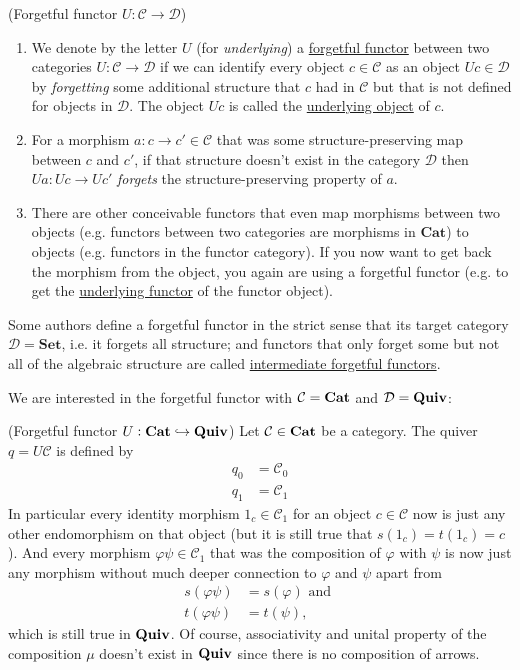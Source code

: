 \begin{example}{(Forgetful functor $U : \mathcal{C} \rightarrow \mathcal{D}$)}
\begin{enumerate}
\renewcommand{\labelenumi}{(\theenumi)}
\item We denote by the letter $U$ (for \textit{underlying}) a \ul{forgetful functor} between two categories $U : \mathcal{C} \rightarrow \mathcal{D}$ if
we can identify every object $c \in \mathcal{C}$ as an object $Uc \in \mathcal{D}$ by \textit{forgetting} some additional structure that $c$ had
in $\mathcal{C}$ but that is not defined for objects in $\mathcal{D}$. The object $Uc$ is called the \ul{underlying object} of $c$.
\item For a morphism $a : c \rightarrow c' \in \mathcal{C}$ that was some structure-preserving map between $c$ and $c'$, if that structure doesn't
exist in the category $\mathcal{D}$ then $Ua : Uc \rightarrow Uc'$ \textit{forgets} the structure-preserving property of $a$.
\item There are other conceivable functors that even map morphisms between two objects
(e.g. functors between two categories are morphisms in $\mathrm{\textbf{Cat}}$) to objects (e.g. functors in the functor category). If you now
want to get back the morphism from the object, you again are using a forgetful functor (e.g. to get the \ul{underlying functor} of the functor object).
\end{enumerate}
Some authors define a forgetful functor in the strict sense that its target category $\mathcal{D} = \mathrm{\textbf{Set}}$, i.e. it forgets all structure;
and functors that only forget some but not all of the algebraic structure are called \ul{intermediate forgetful functors}.
\end{example}

\noindent We are interested in the forgetful functor with $\mathcal{C} = \mathrm{\textbf{Cat}}$ and $\mathcal{D} = \mathrm{\textbf{Quiv}}$:

\begin{example}{(Forgetful functor $U  : \mathrm{\textbf{Cat}} \hookrightarrow \mathrm{\textbf{Quiv}}$)}
Let $\mathcal{C} \in \mathrm{\textbf{Cat}}$ be a category. The quiver $q = U\mathcal{C}$ is defined by
\begin{align}
q_{0} &= \mathcal{C}_{0} \\
q_{1} &= \mathcal{C}_{1}
\end{align}
In particular every identity morphism $1_{c} \in \mathcal{C}_{1}$ for an object $c \in \mathcal{C}$ now is just any other endomorphism
on that object (but it is still true that $s(1_{c}) = t(1_{c}) = c$).
And every morphism $\varphi\psi \in \mathcal{C}_{1}$ that was the composition of $\varphi$ with $\psi$ is now just
any morphism without much deeper connection to $\varphi$ and $\psi$ apart from
\begin{align}
s(\varphi\psi) &= s(\varphi) \text{ and } \\
t(\varphi\psi) &= t(\psi),
\end{align}
which is still true in $\mathrm{\textbf{Quiv}}$. Of course, associativity and unital property of the composition $\mu$ doesn't exist in $\mathrm{\textbf{Quiv}}$ since there is no composition
of arrows.
\end{example}

